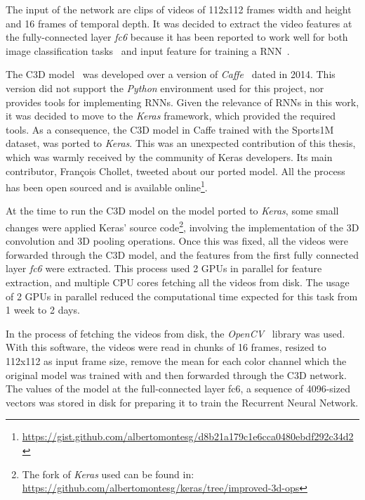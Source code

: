 The input of the network are clips of videos of 112x112 frames width and height and 16 frames of temporal depth. It was decided to extract the video features at the fully-connected layer \textit{fc6} because it has been reported to work well for both image classification tasks~\cite{girshick2014rich} and input feature for training a RNN~\cite{donahue2015long}.

The C3D model~\cite{tran2014learning} was developed over a version of \textit{Caffe}~\cite{jia2014caffe} dated in 2014. This version did not support the \textit{Python} environment used for this project, nor provides tools for implementing RNNs. Given the relevance of RNNs in this work, it was decided to move to the \textit{Keras} framework, which provided the required tools. As a consequence, the C3D model in Caffe trained with the Sports1M~\cite{KarpathyCVPR14} dataset, was ported to \textit{Keras}.
This was an unexpected contribution of this thesis, which was warmly received by the community of Keras developers. Its main contributor, François Chollet, tweeted about our ported model. All the process has been open sourced and is available online\footnote{ \url{https://gist.github.com/albertomontesg/d8b21a179c1e6cca0480ebdf292c34d2}}.


At the time to run the C3D model on the model ported to \textit{Keras}, some small changes were applied Keras' source code\footnote{The fork of \textit{Keras} used can be found in: \url{https://github.com/albertomontesg/keras/tree/improved-3d-ops}}, involving the implementation of the 3D convolution and 3D pooling operations. Once this was fixed, all the videos were forwarded through the C3D model, and the features from the first fully connected layer \textit{fc6} were extracted.
This process used 2 GPUs in parallel for feature extraction, and multiple CPU cores fetching all the videos from disk. The usage of 2 GPUs in parallel reduced the computational time expected for this task from 1 week to 2 days.


In the process of fetching the videos from disk, the \textit{OpenCV}~\cite{opencv_library} library was used. With this software, the videos were read in chunks of 16 frames, resized to 112x112 as input frame size, remove the mean for each color channel which the original model was trained with and then forwarded through the C3D network. The values of the model at the full-connected layer fc6, a sequence of 4096-sized vectors was stored in disk for preparing it to train the Recurrent Neural Network. %

